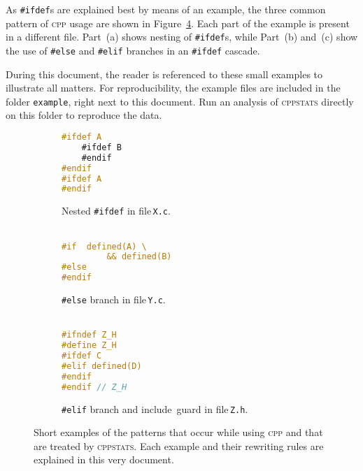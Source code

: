 \documentclass[a4paper]{scrartcl}
\newcommand\code[1]{\texttt{#1}}
\newcommand\tool[1]{\textsc{#1}}
\newcommand\ifdeff[1]{\code{\##1}\xspace}
\newcommand\ifdef[0]{{\upshape\ifdeff{ifdef}}\xspace}
\newcommand\ifdefs[0]{\ifdef{}s\xspace}
\newcommand\cppstats[0]{\tool{cppstats}\xspace}
\newcommand\cpp{\tool{cpp}\xspace}
\begin{document}
As \ifdefs are explained best by means of an example, the three common pattern of \cpp usage are shown in Figure~\ref{fig:examples}.
Each part of the example is present in a different file.
Part~(a) shows nesting of \ifdefs, while Part~(b) and~(c) show the use of \ifdeff{else} and \ifdeff{elif} branches in an \ifdef cascade.

During this document, the reader is referenced to these small examples to illustrate all matters.
For reproducibility, the example files are included in the folder \code{example}, right next to this document.
Run an analysis of \cppstats directly on this folder to reproduce the data.

\begin{figure}[ht]
        \centering
        \begin{subfigure}[b]{0.3\textwidth}
					\begin{lstlisting}[language=C]
#ifdef A
	#ifdef B
	#endif
#endif
#ifdef A
#endif
					\end{lstlisting}
					\caption{Nested \ifdef in file\,\code{X.c}.\\\,}
					\label{fig:examples:a}
        \end{subfigure}
        \hfill
        \begin{subfigure}[b]{0.3\textwidth}
					\begin{lstlisting}[language=C, firstnumber=5]
#if  defined(A) \
		 && defined(B)
#else 
#endif
					\end{lstlisting}
					\caption{\ifdeff{else} branch in file\,\code{Y.c}.\\\,}
					\label{fig:examples:b}
        \end{subfigure}
				\hfill
        \begin{subfigure}[b]{0.3\textwidth}
					\begin{lstlisting}[language=C, firstnumber=8]
#ifndef Z_H
#define Z_H
#ifdef C
#elif defined(D)
#endif
#endif // Z_H
					\end{lstlisting}
					\caption{\ifdeff{elif} branch and include~guard in file\,\code{Z.h}.}
					\label{fig:examples:c}
        \end{subfigure}     
        
        \caption{Short examples of the patterns that occur while using \cpp and that are treated by \cppstats. 
        	Each example and their rewriting rules are explained in this very document.}
        \label{fig:examples}
\end{figure}
\end{document}
